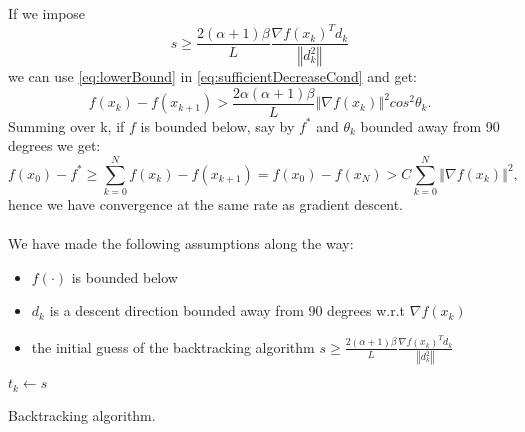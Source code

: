 \documentclass{article}
\newcommand{\norm}[1]{\left\Vert #1 \right\Vert}
\begin{document}
If we impose
\begin{equation}
s\geq\frac{2(\alpha+1)\beta}{L}\frac{\nabla f(x_k)^Td_k}{\norm{d_k^2}}
\end{equation}
we can use \ref{eq:lowerBound} in \ref{eq:sufficientDecreaseCond} and get:
\begin{equation}
f(x_k) - f(x_{k+1}) > \frac{2\alpha(\alpha+1)\beta}{L} \norm{\nabla f(x_k)}^2 cos^2\theta_k.
\end{equation}
Summing over k, if $f$ is bounded below, say by $f^*$ and $\theta_k$ bounded away from 90 degrees we get:
\begin{equation}
	f(x_0)-f^* \geq \sum_{k=0}^N f(x_k) - f(x_{k+1})  = f(x_0)-f(x_N) > C\sum_{k=0}^N\norm{\nabla f(x_k)}^2,
\end{equation}
hence we have convergence at the same rate as gradient descent.\\\\
We have made the following assumptions along the way:
\begin{itemize}
	\item $f(\cdot)$ is bounded below
	\item $d_k$ is a descent direction bounded away from 90 degrees w.r.t $\nabla f(x_k)$
	\item the initial guess of the backtracking algorithm $s\geq\frac{2(\alpha+1)\beta}{L}\frac{\nabla f(x_k)^Td_k}{\norm{d_k^2}}$
\end{itemize}


\begin{algorithm}[!h]
	$t_k\gets s$\\
	\caption{Backtracking algorithm.}
	\label{algo:backtracking}
\end{algorithm}
 
\end{document}
